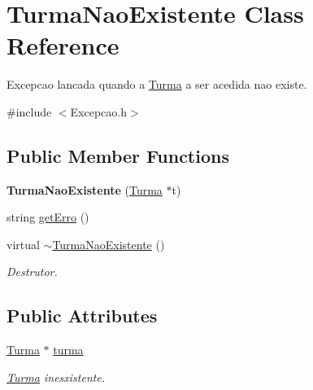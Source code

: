 \hypertarget{class_turma_nao_existente}{\section{Turma\-Nao\-Existente Class Reference}
\label{class_turma_nao_existente}
}


Excepcao lancada quando a \hyperlink{class_turma}{Turma} a ser acedida nao existe.  




{\ttfamily \#include $<$Excepcao.\-h$>$}

\subsection*{Public Member Functions}
\begin{DoxyCompactItemize}
\item 
\hypertarget{class_turma_nao_existente_a9c2b3b2ad6de696dd3432951b278c975}{{\bfseries Turma\-Nao\-Existente} (\hyperlink{class_turma}{Turma} $\ast$t)}\label{class_turma_nao_existente_a9c2b3b2ad6de696dd3432951b278c975}

\item 
string \hyperlink{class_turma_nao_existente_a5672fe80509c285ce4468137c3574351}{get\-Erro} ()
\item 
\hypertarget{class_turma_nao_existente_a89025d5c39ff6a1590e2e7bb010fa3b7}{virtual \hyperlink{class_turma_nao_existente_a89025d5c39ff6a1590e2e7bb010fa3b7}{$\sim$\-Turma\-Nao\-Existente} ()}\label{class_turma_nao_existente_a89025d5c39ff6a1590e2e7bb010fa3b7}

\begin{DoxyCompactList}\small\item\em Destrutor. \end{DoxyCompactList}\end{DoxyCompactItemize}
\subsection*{Public Attributes}
\begin{DoxyCompactItemize}
\item 
\hypertarget{class_turma_nao_existente_ab14dc459c3d9bd70bea8e583b2ce072e}{\hyperlink{class_turma}{Turma} $\ast$ \hyperlink{class_turma_nao_existente_ab14dc459c3d9bd70bea8e583b2ce072e}{turma}}\label{class_turma_nao_existente_ab14dc459c3d9bd70bea8e583b2ce072e}

\begin{DoxyCompactList}\small\item\em \hyperlink{class_turma}{Turma} inesxistente. \end{DoxyCompactList}\end{DoxyCompactItemize}


